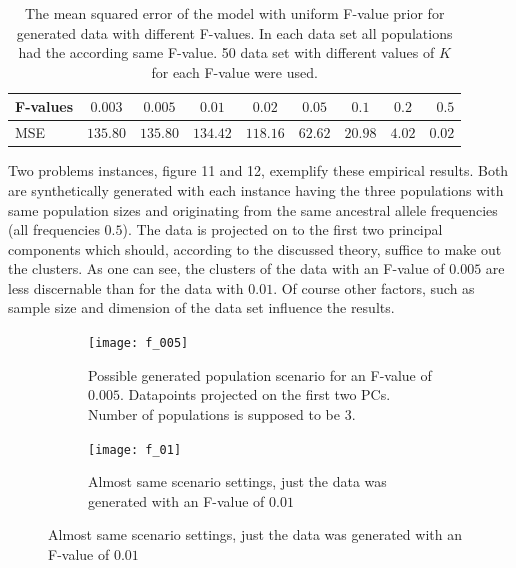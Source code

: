 \documentclass[a4paper, 11pt]{article}
\begin{document}
\begin{table}[h!]
  \begin{center}
    \label{tab:table1}
    \begin{tabular}{l|c|c|c|c|c|c|c|r} %
      \textbf{F-values} & $\mathbf{0.003}$ & $\mathbf{0.005}$ & $\mathbf{0.01}$ & $\mathbf{0.02}$ & $\mathbf{0.05}$ & $\mathbf{0.1}$ & $\mathbf{0.2}$ & $\mathbf{0.5}$\\
      \hline
      MSE & $135.80$ & $135.80$ & $134.42$ & $118.16$ & $62.62$  & $20.98$ & $4.02$ & $0.02$\\
    \end{tabular}
    \caption{The mean squared error of the model with uniform F-value prior for generated data with different F-values. In each data set all populations had the according same F-value. 50 data set with different values of $K$ for each F-value were used.}
  \end{center}
\end{table}

Two problems instances, figure 11 and 12, exemplify these empirical results. Both are synthetically generated with each instance having the three populations with same population sizes and originating from the same ancestral allele frequencies (all frequencies $0.5$). The data is projected on to the first two principal components which should, according to the discussed theory, suffice to make out the clusters. As one can see, the clusters of the data with an F-value of $0.005$ are less discernable than for the data with $0.01$. Of course other factors, such as sample size and dimension of the data set influence the results.\\


\begin{figure}
\centering
\begin{subfigure}
\centering
\texttt{[image: f\_005]}
\caption{Possible generated population scenario for an F-value of $0.005$. Datapoints projected on the first two PCs. Number of populations is supposed to be 3.}
\end{subfigure}
\begin{subfigure}
\centering
\texttt{[image: f\_01]}
\caption{Almost same scenario settings, just the data was generated with an F-value of $0.01$}
\end{subfigure}
\end{figure}
\end{document}
